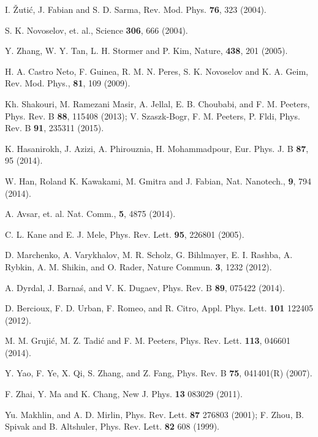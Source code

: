 \documentclass[doublecol]{epl2}
\begin{document}
\begin{thebibliography}{0}
I. \v{Z}uti\'{c}, J. Fabian and S. D. Sarma, Rev. Mod. Phys. {\bf 76}, 323 (2004).

S. K. Novoselov, et. al., Science {\bf 306}, 666 (2004).

Y. Zhang, W. Y. Tan, L. H. Stormer and P. Kim, Nature, {\bf 438},
201 (2005).

H. A. Castro Neto, F. Guinea, R. M. N. Peres, S. K. Novoselov and K. A. Geim,
Rev. Mod. Phys., {\bf 81}, 109 (2009).

 Kh. Shakouri, M. Ramezani Masir, A. Jellal, E. B. Choubabi,
and F. M. Peeters, Phys. Rev. B  {\bf 88}, 115408 (2013); V. Szaszk-Bogr, F. M. Peeters, P. Fldi, Phys. Rev. B
{\bf 91}, 235311 (2015).

  K. Hasanirokh, J. Azizi, A. Phirouznia, H. Mohammadpour, Eur. Phys. J. B {\bf 87}, 95 (2014).

W. Han, Roland K. Kawakami, M. Gmitra and J. Fabian, Nat. Nanotech., {\bf 9}, 794 (2014).

A. Avsar, et. al. Nat. Comm., {\bf 5}, 4875 (2014).

C. L. Kane and E. J. Mele, Phys. Rev. Lett. {\bf 95}, 226801 (2005).

D. Marchenko, A. Varykhalov, M. R. Scholz, G. Bihlmayer, E. I. Rashba, A. Rybkin, A. M. Shikin, and O. Rader,
Nature Commun. {\bf 3}, 1232 (2012).

A. Dyrdal, J. Barna\'{s}, and V. K. Dugaev, Phys. Rev. B  {\bf 89}, 075422 (2014).

D. Bercioux, F. D. Urban, F. Romeo, and R. Citro, Appl. Phys. Lett.  {\bf 101}
122405 (2012). %

M. M. Gruji\'{c}, M. Z. Tadi\'{c} and F. M. Peeters,
Phys. Rev. Lett. {\bf 113}, 046601 (2014).

Y. Yao, F. Ye, X. Qi, S. Zhang, and Z. Fang, Phys. Rev. B {\bf 75}, 041401(R) (2007).

F. Zhai, Y. Ma and K. Chang, New J. Phys. {\bf 13} 083029 (2011).

Yu. Makhlin, and A. D. Mirlin, Phys. Rev. Lett. {\bf 87} 276803 (2001); F. Zhou, B. Spivak and B. Altshuler,
Phys. Rev. Lett. {\bf 82} 608 (1999).


\end{thebibliography}
\end{document}
